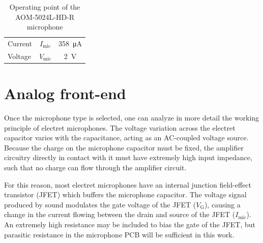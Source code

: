 \documentclass{EPL-master-thesis-covers-EN}
\newcommand{\te}[1]{\textrm{#1}}
\begin{document}
\begin{table}[H]
\centering
\begin{tabular}{lcc}
\toprule
 Current & $I_{\te{mic}}$   & \SI{358}{\micro A} \\
 Voltage & $V_{\te{mic}}$   & \SI{2}{V}          \\ \bottomrule
\end{tabular}
\caption{Operating point of the AOM-5024L-HD-R microphone}
\label{tab:op_point_mic}
\end{table}

\section{Analog front-end}
\label{section:AFE}

Once the microphone type is selected, one can analyze in more detail the working principle of electret microphones.
The voltage variation across the electret capacitor varies with the capacitance, acting as an AC-coupled voltage source. Because the charge on the microphone capacitor must be fixed, the amplifier circuitry directly in contact with it must have extremely high input impedance, such that no charge can flow through the amplifier circuit. 

For this reason, most electret microphones have an internal junction field-effect transistor (JFET) which buffers the microphone capacitor. The voltage signal produced by sound modulates the gate voltage of the JFET ($V_\te{G}$), causing a change in the current flowing between the drain and source of the JFET ($I_{\te{mic}}$). An extremely high resistance may be included to bias the gate of the JFET, but parasitic resistance in the microphone PCB will be sufficient in this work.
\end{document}
